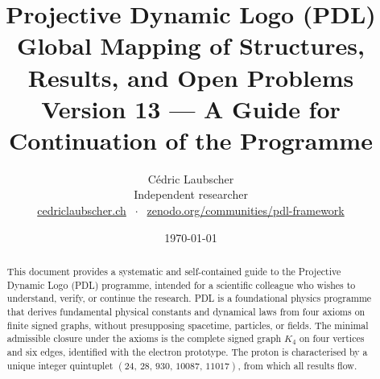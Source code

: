 \documentclass[11pt,a4paper]{article}
\title{Projective Dynamic Logo (PDL)\\[4pt]
\large Global Mapping of Structures, Results, and Open Problems\\[2pt]
\normalsize Version 13 — A Guide for Continuation of the Programme}
\author{C\'edric Laubscher\\[4pt]
\small Independent researcher\\
\small \href{https://cedriclaubscher.ch}{cedriclaubscher.ch}
$\;\cdot\;$
\small \href{https://zenodo.org/communities/pdl-framework/}{zenodo.org/communities/pdl-framework}}
\date{\today}
\theoremstyle{plain}
\theoremstyle{definition}
\theoremstyle{remark}
\newcommand{\Kfour}{K_4}
\newcommand{\quintuplet}{(24,\,28,\,930,\,10087,\,11017)}
\begin{document}
\maketitle
\setcounter{tocdepth}{2}
\tableofcontents
\clearpage

\begin{abstract}
This document provides a systematic and self-contained guide to the Projective Dynamic Logo (PDL) programme, intended for a scientific colleague who wishes to understand, verify, or continue the research.
PDL is a foundational physics programme that derives fundamental physical constants and dynamical laws from four axioms on finite signed graphs, without presupposing spacetime, particles, or fields.
The minimal admissible closure under the axioms is the complete signed graph $\Kfour$ on four vertices and six edges, identified with the electron prototype.
The proton is characterised by a unique integer quintuplet $\quintuplet$, from which all results flow.


\end{abstract}
\end{document}
